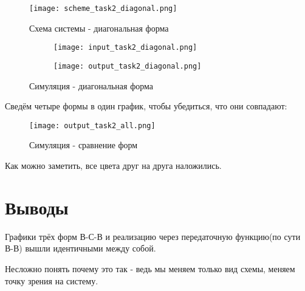 \newpage
\begin{figure}[ht]
    \centering
    \texttt{[image: scheme\_task2\_diagonal.png]}
	\caption{Схема системы - диагональная форма}
\end{figure}
\begin{figure}[h]
	\begin{subfigure}{0.5\textwidth}
		\texttt{[image: input\_task2\_diagonal.png]} 
	\end{subfigure}
	\begin{subfigure}{0.5\textwidth}
		\texttt{[image: output\_task2\_diagonal.png]}
	\end{subfigure}
	\caption{Симуляция - диагональная форма}
\end{figure}

\newpage

Сведём четыре формы в один график, чтобы убедиться, что они совпадают:
\begin{figure}[ht]
    \centering
    \texttt{[image: output\_task2\_all.png]}
	\caption{Симуляция - сравнение форм}
\end{figure}
Как можно заметить, все цвета друг на друга наложились.
\section{Выводы}

Графики трёх форм В-С-В и реализацию через передаточную функцию(по сути В-В) вышли идентичными между собой.

Несложно понять почему это так - ведь мы меняем только вид схемы, меняем точку зрения на систему.

\endinput